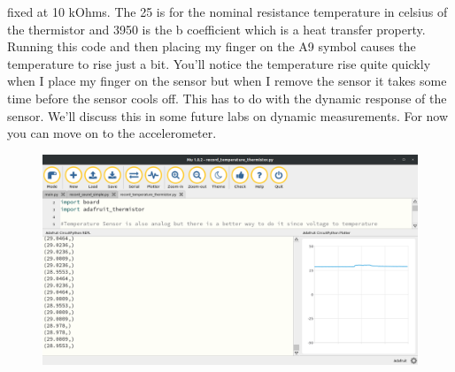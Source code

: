 {fixed at 10 kOhms. The 25 is for the nominal resistance temperature in
celsius of the thermistor and 3950 is the b coefficient which is a
heat transfer property. Running this code and then placing my finger
on the A9 symbol causes the temperature to rise just a bit. You’ll
notice the temperature rise quite quickly when I place my finger on
the sensor but when I remove the sensor it takes some time before the
sensor cools off. This has to do with the dynamic response of the
sensor. We’ll discuss this in some future labs on dynamic
measurements. For now you can move on to the accelerometer. 
\begin{figure}[H]
  \begin{center}
    \includegraphics[width=\textwidth]{Figures/thermistor_mu.png}
  \end{center}
\end{figure}
}
